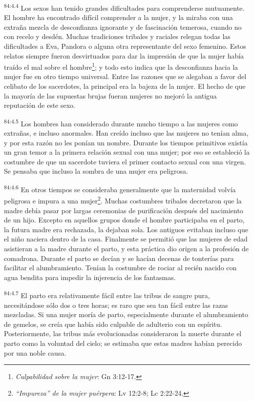\documentclass[twoside, 11pt]{book}
\begin{document}
\par
\textsuperscript{84:4.4} Los sexos han tenido grandes dificultades para comprenderse mutuamente. El hombre ha encontrado difícil comprender a la mujer, y la miraba con una extraña mezcla de desconfianza ignorante y de fascinación temerosa, cuando no con recelo y desdén. Muchas tradiciones tribales y raciales relegan todas las dificultades a Eva, Pandora o alguna otra representante del sexo femenino. Estos relatos siempre fueron desvirtuados para dar la impresión de que la mujer había traído el mal sobre el hombre\footnote{\textit{Culpabilidad sobre la mujer}: Gn 3:12-17.}; y todo esto indica que la desconfianza hacia la mujer fue en otro tiempo universal. Entre las razones que se alegaban a favor del celibato de los sacerdotes, la principal era la bajeza de la mujer. El hecho de que la mayoría de las supuestas brujas fueran mujeres no mejoró la antigua reputación de este sexo.

\par
\textsuperscript{84:4.5} Los hombres han considerado durante mucho tiempo a las mujeres como extrañas, e incluso anormales. Han creído incluso que las mujeres no tenían alma, y por esta razón no les ponían un nombre. Durante los tiempos primitivos existía un gran temor a la primera relación sexual con una mujer; por eso se estableció la costumbre de que un sacerdote tuviera el primer contacto sexual con una virgen. Se pensaba que incluso la sombra de una mujer era peligrosa.

\par
\textsuperscript{84:4.6} En otros tiempos se consideraba generalmente que la maternidad volvía peligrosa e impura a una mujer\footnote{\textit{``Impureza'' de la mujer puérpera}: Lv 12:2-8; Lc 2:22-24.}. Muchas costumbres tribales decretaron que la madre debía pasar por largas ceremonias de purificación después del nacimiento de un hijo. Excepto en aquellos grupos donde el hombre participaba en el parto, la futura madre era rechazada, la dejaban sola. Los antiguos evitaban incluso que el niño naciera dentro de la casa. Finalmente se permitió que las mujeres de edad asistieran a la madre durante el parto, y esta práctica dio origen a la profesión de comadrona. Durante el parto se decían y se hacían decenas de tonterías para facilitar el alumbramiento. Tenían la costumbre de rociar al recién nacido con agua bendita para impedir la injerencia de los fantasmas.

\par
\textsuperscript{84:4.7} El parto era relativamente fácil entre las tribus de sangre pura, necesitándose sólo dos o tres horas; es raro que sea tan fácil entre las razas mezcladas. Si una mujer moría de parto, especialmente durante el alumbramiento de gemelos, se creía que había sido culpable de adulterio con un espíritu. Posteriormente, las tribus más evolucionadas consideraron la muerte durante el parto como la voluntad del cielo; se estimaba que estas madres habían perecido por una noble causa.
\end{document}
